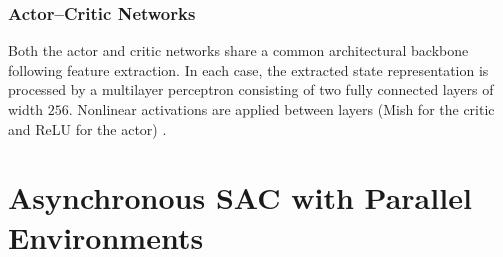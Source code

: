 \documentclass{article}
\begin{document}
\subsubsection{Actor--Critic Networks}
\label{sec:actor_critic}

Both the actor and critic networks share a common architectural backbone following feature extraction. In each case, the extracted state representation is processed by a multilayer perceptron consisting of two fully connected layers of width $256$. Nonlinear activations are applied between layers (Mish for the critic and ReLU for the actor) .
\newpage
\section{Asynchronous SAC with Parallel Environments}
\end{document}

